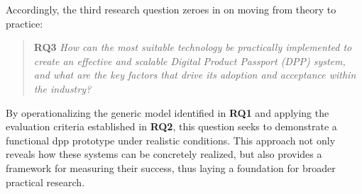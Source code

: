 Accordingly, the third research question zeroes in on moving from theory to practice:

\begin{quote}
    \textbf{RQ3} \textit{How can the most suitable technology be practically implemented to create an effective and scalable Digital Product Passport (DPP) system, and what are the key factors that drive its adoption and acceptance within the industry?}
\end{quote}

By operationalizing the generic model identified in \textbf{RQ1} and applying the evaluation criteria established in \textbf{RQ2}, this question seeks to demonstrate a functional \ac{dpp} prototype under realistic conditions. This approach not only reveals how these systems can be concretely realized, but also provides a framework for measuring their success, thus laying a foundation for broader practical research.